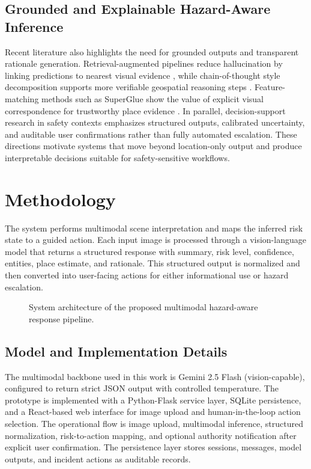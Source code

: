 \documentclass[10pt,conference]{IEEEtran}
\begin{document}
\subsection{Grounded and Explainable Hazard-Aware Inference}
Recent literature also highlights the need for grounded outputs and transparent rationale generation. Retrieval-augmented pipelines reduce hallucination by linking predictions to nearest visual evidence \cite{waheed2025vlm, li2025pixels}, while chain-of-thought style decomposition supports more verifiable geospatial reasoning steps \cite{yerramilli2025geochain, cheng2025geoguess}. Feature-matching methods such as SuperGlue show the value of explicit visual correspondence for trustworthy place evidence \cite{sarlin2020superglue}. In parallel, decision-support research in safety contexts emphasizes structured outputs, calibrated uncertainty, and auditable user confirmations rather than fully automated escalation. These directions motivate systems that move beyond location-only output and produce interpretable decisions suitable for safety-sensitive workflows.

\section{Methodology}

The system performs multimodal scene interpretation and maps the inferred risk state to a guided action. Each input image is processed through a vision-language model that returns a structured response with summary, risk level, confidence, entities, place estimate, and rationale. This structured output is normalized and then converted into user-facing actions for either informational use or hazard escalation.

\begin{figure}[!t]
\centering
\resizebox{0.96\textwidth}{!}{}
\caption{System architecture of the proposed multimodal hazard-aware response pipeline.}
\label{fig:system_architecture}
\end{figure}

\subsection{Model and Implementation Details}
The multimodal backbone used in this work is Gemini 2.5 Flash (vision-capable), configured to return strict JSON output with controlled temperature. The prototype is implemented with a Python-Flask service layer, SQLite persistence, and a React-based web interface for image upload and human-in-the-loop action selection. The operational flow is image upload, multimodal inference, structured normalization, risk-to-action mapping, and optional authority notification after explicit user confirmation. The persistence layer stores sessions, messages, model outputs, and incident actions as auditable records.
\end{document}
